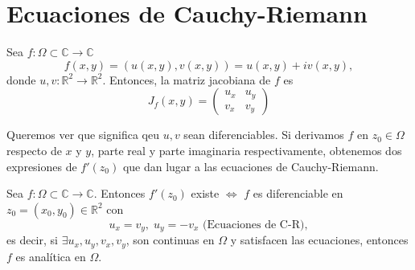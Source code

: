 \section{Ecuaciones de Cauchy-Riemann}

\begin{nota}
  Sea $f: \Omega \subset \mathbb{C} \to \mathbb{C}$ 
  \[ 
    f(x,y) = (u(x, y), v(x, y)) = u(x, y) + i v(x, y) ,
  \] 
  donde $u, v: \mathbb{R}^{2} \to \mathbb{R}^{2}$. Entonces, la matriz jacobiana de $f$ es 
  \[ J_{f}(x,y) =
    \begin{pmatrix}
       u_{x} & u_{y} \\
       v_{x} & v_{y}
    \end{pmatrix} 
  \] 
\end{nota} 

\begin{note}
  Queremos ver que significa qeu $ u, v$ sean diferenciables. Si derivamos $f$ en $z_{0} \in \Omega$ respecto de $x$ y $y$, parte real y parte imaginaria respectivamente, obtenemos dos expresiones de $f'(z_{0})$ que dan lugar a las ecuaciones de Cauchy-Riemann.
\end{note}

\begin{theo}
  Sea $f: \Omega \subset \mathbb{C} \to \mathbb{C}$. Entonces $f'(z_{0})$ existe $\Leftrightarrow$ $f$ es diferenciable en $z_{0} = (x_{0}, y_{0}) \in \mathbb{R}^{2}$ con
  \[ 
    u_{x} = v_{y}, \; u_{y} = -v_{x} \text{ (Ecuaciones de C-R)} ,
  \] 
  es decir, si $\exists u_{x}, u_{y}, v_{x}, v_{y}$, son continuas en $\Omega$ y satisfacen las ecuaciones, entonces $f$ es analítica en $\Omega$.
\end{theo}

